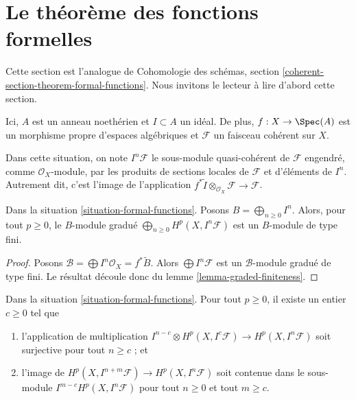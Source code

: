\section{Le théorème des fonctions formelles}
\label{section-theorem-formal-functions}

\noindent
Cette section est l'analogue de
Cohomologie des schémas, section \ref{coherent-section-theorem-formal-functions}.
Nous invitons le lecteur à lire d'abord cette section.

\begin{situation}
\label{situation-formal-functions}
Ici, $A$ est un anneau noethérien et $I \subset A$ un idéal.
De plus, $f : X \to \Spec(A)$ est un morphisme propre d'espaces algébriques
et $\mathcal{F}$ un faisceau cohérent sur $X$.
\end{situation}

\noindent
Dans cette situation, on note $I^n\mathcal{F}$ le sous-module quasi-cohérent
de $\mathcal{F}$ engendré, comme $\mathcal{O}_X$-module,
par les produits de sections locales de $\mathcal{F}$ et d'éléments de $I^n$.
Autrement dit, c'est l'image de l'application
$f^*\widetilde{I} \otimes_{\mathcal{O}_X} \mathcal{F} \to \mathcal{F}$.

\begin{lemma}
\label{lemma-cohomology-powers-ideal-times-F}
Dans la situation \ref{situation-formal-functions}.
Posons $B = \bigoplus_{n \geq 0} I^n$.
Alors, pour tout $p \geq 0$, le $B$-module gradué
$\bigoplus_{n \geq 0} H^p(X, I^n\mathcal{F})$ est
un $B$-module de type fini.
\end{lemma}

\begin{proof}
Posons $\mathcal{B} = \bigoplus I^n\mathcal{O}_X = f^*\widetilde{B}$.
Alors $\bigoplus I^n\mathcal{F}$ est un $\mathcal{B}$-module
gradué de type fini. Le résultat découle donc
du lemme \ref{lemma-graded-finiteness}.
\end{proof}

\begin{lemma}
\label{lemma-cohomology-powers-ideal-application}
Dans la situation \ref{situation-formal-functions}.
Pour tout $p \geq 0$, il existe un entier $c \geq 0$ tel que
\begin{enumerate}
\item l'application de multiplication
$I^{n - c} \otimes H^p(X, I^c\mathcal{F}) \to H^p(X, I^n\mathcal{F})$
soit surjective pour tout $n \geq c$ ; et
\item l'image de $H^p(X, I^{n + m}\mathcal{F}) \to H^p(X, I^n\mathcal{F})$
soit contenue dans le sous-module $I^{m - c} H^p(X, I^n\mathcal{F})$
pour tout $n \geq 0$ et tout $m \geq c$.
\end{enumerate}
\end{lemma}


